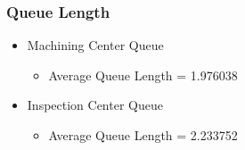 \documentclass[aps,letterpaper,10pt]{revtex4}
\begin{document}
        \subsubsection{Queue Length}
            \begin{itemize}
                \item Machining Center Queue
                    \begin{itemize}
                        \item Average Queue Length = 1.976038
                    \end{itemize}
                    \begin{figure}[htp]
                        \begin{center}
                        \end{center}
                    \end{figure}
                \item Inspection Center Queue
                    \begin{itemize}
                        \item Average Queue Length = 2.233752
                    \end{itemize}
                    \begin{figure}[htp]
                        \begin{center}
\end{center}
\end{figure}
\end{itemize}
\end{document}

